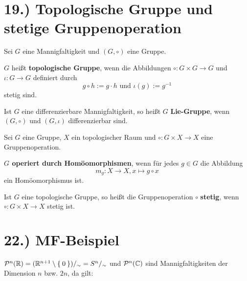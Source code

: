 \documentclass[a5paper,oneside]{scrbook}
\begin{document}
\section*{19.) Topologische Gruppe und stetige Gruppenoperation}
\begin{definition}%
    Sei $G$ eine Mannigfaltigkeit und $(G, \circ)$ eine Gruppe.

    \begin{defenum}
        \item $G$ heißt \textbf{topologische Gruppe},
              wenn die Abbildungen $\circ: G \times G \rightarrow G$
              und $\iota: G \rightarrow G$ definiert durch
              \[g \circ h := g \cdot h \text{ und } \iota(g) := g^{-1}\]
              stetig sind.
        \item Ist $G$ eine differenzierbare Mannigfaltigkeit, so heißt
              $G$ \textbf{Lie-Gruppe}, wenn
              $(G, \circ)$ und $(G, \iota)$ differenzierbar sind.
    \end{defenum}
\end{definition}

\begin{definition}
    Sei $G$ eine Gruppe, $X$ ein topologischer Raum und
    $\circ: G \times X \rightarrow X$ eine Gruppenoperation.

    \begin{defenum}
        \item {}\textbf{$G$ operiert durch Homöomorphismen}, wenn für jedes $g \in G$
              die Abbildung
              \[m_g: X \rightarrow X, x \mapsto g \circ x\]
              ein Homöomorphismus ist.
        \item Ist $G$ eine topologische Gruppe, so heißt die Gruppenoperation $\circ$
              \textbf{stetig}, wenn 
              $\circ: G \times X \rightarrow X$ stetig ist.
    \end{defenum}
\end{definition}


\section*{22.) MF-Beispiel}
$\mathcal{P}^n(\mathbb{R}) = (\mathbb{R}^{n+1} \setminus \Set{0})/_\sim = S^n /_\sim$ und $\mathcal{P}^n(\mathbb{C})$ sind Mannigfaltigkeiten
der Dimension $n$ bzw. $2n$, da gilt:
\end{document}
